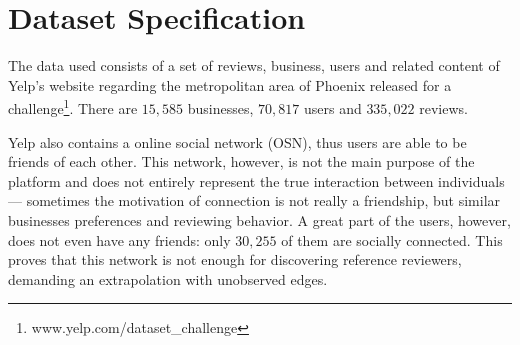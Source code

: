 \section{Dataset Specification}
The data used consists of a set of reviews, business, users and related content of Yelp's website regarding the metropolitan area of Phoenix released for a challenge\footnote{www.yelp.com/dataset\_challenge}. There are $15,585$ businesses, $70,817$ users and $335,022$ reviews.

Yelp also contains a online social network (OSN), thus users are able to be friends of each other. This network, however, is not the main purpose of the platform and does not entirely represent the true interaction between individuals --- sometimes the motivation of connection is not really a friendship, but similar businesses preferences and reviewing behavior. A great part of the users, however, does not even have any friends: only $30,255$ of them are socially connected. This proves that this network is not enough for discovering reference reviewers, demanding an extrapolation with unobserved edges.
